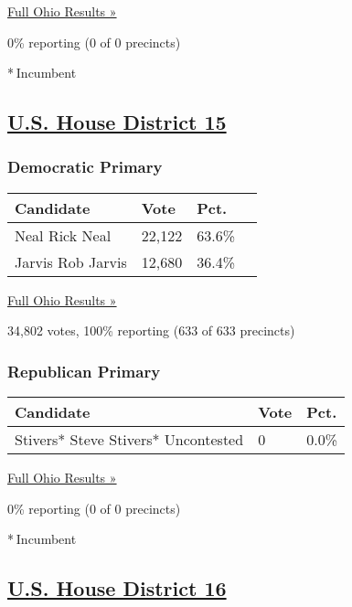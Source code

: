 \href{https://www.nytimes3xbfgragh.onion/elections/results/ohio}{Full
Ohio Results »}

0\% reporting (0 of 0 precincts)

* Incumbent

\hypertarget{us-house-district-15}{%
\subsection{\texorpdfstring{\href{https://www.nytimes3xbfgragh.onion/elections/results/ohio-house-district-15-primary-election}{U.S.
House District
15}}{U.S. House District 15}}\label{us-house-district-15}}

\hypertarget{democratic-primary-16}{%
\subsubsection{Democratic Primary}\label{democratic-primary-16}}

\begin{longtable}[]{@{}llll@{}}
\toprule
Candidate & Vote & Pct. &\tabularnewline
\midrule
\endhead
 Neal Rick Neal & 22,122 & 63.6\% &\tabularnewline
 Jarvis Rob Jarvis & 12,680 & 36.4\% &\tabularnewline
\bottomrule
\end{longtable}

\href{https://www.nytimes3xbfgragh.onion/elections/results/ohio}{Full
Ohio Results »}

34,802 votes, 100\% reporting (633 of 633 precincts)

\hypertarget{republican-primary-16}{%
\subsubsection{Republican Primary}\label{republican-primary-16}}

\begin{longtable}[]{@{}lll@{}}
\toprule
Candidate & Vote & Pct.\tabularnewline
\midrule
\endhead
 Stivers* Steve Stivers* Uncontested & 0 & 0.0\%\tabularnewline
\bottomrule
\end{longtable}

\href{https://www.nytimes3xbfgragh.onion/elections/results/ohio}{Full
Ohio Results »}

0\% reporting (0 of 0 precincts)

* Incumbent

\hypertarget{us-house-district-16}{%
\subsection{\texorpdfstring{\href{https://www.nytimes3xbfgragh.onion/elections/results/ohio-house-district-16-primary-election}{U.S.
House District
16}}{U.S. House District 16}}\label{us-house-district-16}}

